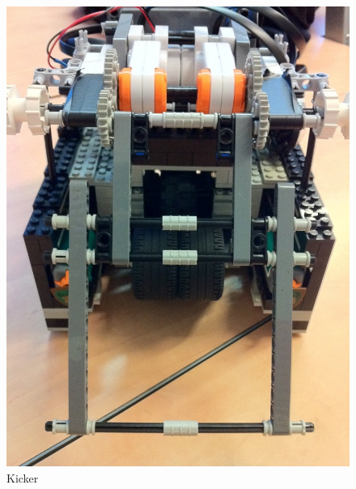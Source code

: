 \documentclass[12pt, a4paper, titlepage]{article}
\begin{document}
\begin{figure}[ht]
\begin{minipage}[b]{0.5\linewidth}
\includegraphics[scale=0.2]{images/robot/kicker.jpg}
\caption{Kicker}
\label{fig:kicker}
\end{minipage}
\end{figure}
\end{document}
